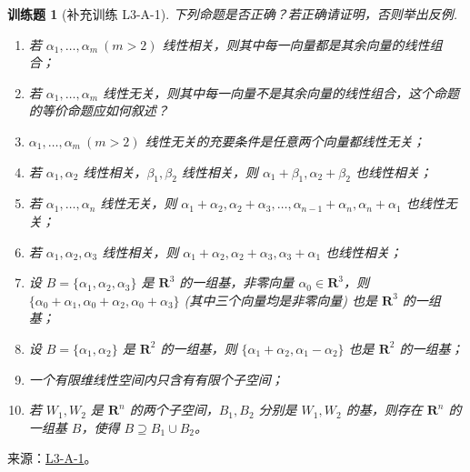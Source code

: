 \documentclass[12pt,fontset=fandol]{ctexart}
\newtheorem{exercise}{训练题}[section]
\begin{document}
\begin{exercise}[补充训练 L3-A-1]\label{prob:L3-A-1}
下列命题是否正确？若正确请证明，否则举出反例.
        \begin{enumerate}
            \item 若 $\alpha_1, \ldots, \alpha_m \ (m > 2)$ 线性相关，则其中每一向量都是其余向量的线性组合；

            \item 若 $\alpha_1, \ldots, \alpha_m$ 线性无关，则其中每一向量不是其余向量的线性组合，这个命题的等价命题应如何叙述？

            \item $\alpha_1, \ldots, \alpha_m \ (m > 2)$ 线性无关的充要条件是任意两个向量都线性无关；

            \item  若 $\alpha_1, \alpha_2$ 线性相关，$ \beta_1, \beta_2$ 线性相关，则 $\alpha_1 + \beta_1, \alpha_2 + \beta_2$ 也线性相关；

            \item 若 $\alpha_1, \ldots, \alpha_n$ 线性无关，则 $\alpha_1 + \alpha_2, \alpha_2 + \alpha_3, \ldots, \alpha_{n-1} + \alpha_n, \alpha_n + \alpha_1$ 也线性无关；

            \item 若 $\alpha_1, \alpha_2, \alpha_3$ 线性相关，则 $\alpha_1 + \alpha_2, \alpha_2 + \alpha_3, \alpha_3 + \alpha_1$ 也线性相关；

            \item 设 $B = \{\alpha_1, \alpha_2, \alpha_3\}$ 是 $ \mathbf{R}^3 $ 的一组基，非零向量 $\alpha_0 \in \mathbf{R}^3$，则 $\{\alpha_0 + \alpha_1, \alpha_0 + \alpha_2, \alpha_0 + \alpha_3\}$ (其中三个向量均是非零向量) 也是 $\mathbf{R}^3$ 的一组基；

            \item  设 $B = \{\alpha_1, \alpha_2\}$ 是 $\mathbf{R}^2$ 的一组基，则 $\{\alpha_1 + \alpha_2, \alpha_1 - \alpha_2\}$ 也是 $\mathbf{R}^2$ 的一组基；

            \item 一个有限维线性空间内只含有有限个子空间；

            \item  若 $W_1, W_2$ 是 $ \mathbf{R}^n $ 的两个子空间，$B_1, B_2$ 分别是 $W_1, W_2$ 的基，则存在 $ \mathbf{R}^n $ 的一组基 $B$，使得 $B \supseteq B_1 \cup B_2$。

        \end{enumerate}
\end{exercise}
\noindent 来源：\href{https://github.com/yhwu-is/Linear-Algebra-Left-Undone/blob/new/%E8%AE%B2%E4%B9%89/%E4%B8%93%E9%A2%98/3%20%E6%9C%89%E9%99%90%E7%BB%B4%E7%BA%BF%E6%80%A7%E7%A9%BA%E9%97%B4.tex}{L3-A-1}。
\end{document}
